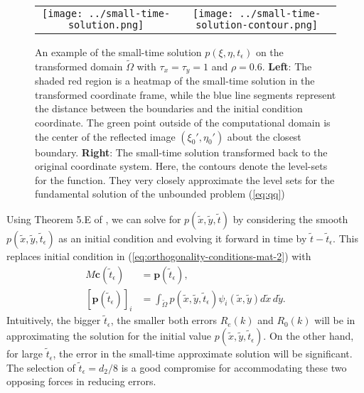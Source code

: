 \begin{figure}
  \centering
  \begin{tabular}{cc}
    \begin{minipage}{0.5\textwidth}
      \centering
      \texttt{[image: ../small-time-solution.png]}
    \end{minipage}
    & \begin{minipage}{0.5\textwidth}
      \centering
      \texttt{[image: ../small-time-solution-contour.png]}
    \end{minipage}
  \end{tabular}
  \caption{An example of the small-time solution
    $p(\xi,\eta,t_\epsilon)$ on the transformed domain
    $\tilde{\Omega}$ with $\tau_x = \tau_y = 1$ and
    $\rho=0.6$. \textbf{Left}: The shaded red region is a heatmap of
    the small-time solution in the transformed coordinate frame, while
    the blue line segments represent the distance between the
    boundaries and the initial condition coordinate. The green point
    outside of the computational domain is the center of the reflected
    image $(\xi_0', \eta_0')$ about the closest
    boundary. \textbf{Right}: The small-time solution transformed back
    to the original coordinate system. Here, the contours denote the
    level-sets for the function. They very closely approximate the
    level sets for the fundamental solution of the unbounded problem
    (\ref{eq:qq})}
  \label{fig:step-1-small-time}
\end{figure}
Using Theorem 5.E of \cite{zeidler1995applied}, we can solve for
$p(\tilde{x},\tilde{y},\tilde{t})$ by considering the smooth
$p(\tilde{x},\tilde{y},\tilde{t}_\epsilon)$ as an initial condition
and evolving it forward in time by $\tilde{t} -
\tilde{t}_\epsilon$. This replaces initial condition in
(\ref{eq:orthogonality-conditions-mat-2}) with
\begin{align}
  M \mathbf{c}(\tilde{t}_\epsilon) &= \mathbf{p}(\tilde{t}_\epsilon), \\
  [\mathbf{p}(\tilde{t}_\epsilon)]_i &= \displaystyle \int_{\tilde{\Omega}} p(\tilde{x},\tilde{y},\tilde{t}_\epsilon) \psi_i(\tilde{x},\tilde{y}) d\tilde{x}\,d\tilde{y}. \nonumber
\end{align}
Intuitively, the bigger $\tilde{t}_\epsilon$, the smaller both errors
$R_e(k)$ and $R_0(k)$ will be in approximating the solution for the
initial value $p(\tilde{x},\tilde{y},\tilde{t}_\epsilon)$. On the
other hand, for large $\tilde{t}_\epsilon$, the error in the
small-time approximate solution will be significant. The selection of
$\tilde{t}_\epsilon = d_2/8$ is a good compromise for accommodating
these two opposing forces in reducing errors.




